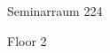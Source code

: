 \documentclass[a4paper]{article}
\begin{document}
\printGenericVSLHeader
\begin{center}
\begin{vsltext}{3cm}{4cm}


    \vspace{0.5cm}

    Seminarraum 224 

    \vspace{0.5cm}

    Floor 2

\end{vsltext}

\end{center}
\end{document}
